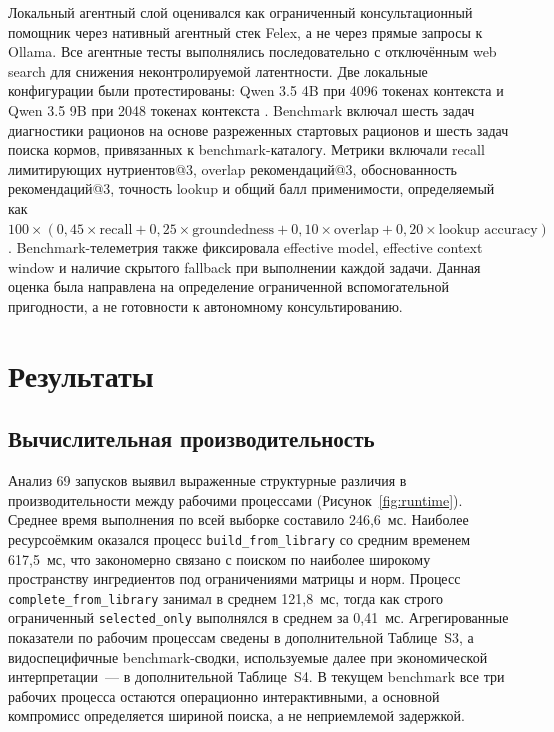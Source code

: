\documentclass[a4paper,fleqn]{cas-sc}
\begin{document}
Локальный агентный слой оценивался как ограниченный консультационный помощник через нативный агентный стек Felex, а не через прямые запросы к Ollama. Все агентные тесты выполнялись последовательно с отключённым web search для снижения неконтролируемой латентности. Две локальные конфигурации были протестированы: Qwen 3.5 4B при 4096 токенах контекста и Qwen 3.5 9B при 2048 токенах контекста \citep{qwen2023, ollama2023}. Benchmark включал шесть задач диагностики рационов на основе разреженных стартовых рационов и шесть задач поиска кормов, привязанных к benchmark-каталогу. Метрики включали recall лимитирующих нутриентов@3, overlap рекомендаций@3, обоснованность рекомендаций@3, точность lookup и общий балл применимости, определяемый как $100 \times (0{,}45 \times \text{recall} + 0{,}25 \times \text{groundedness} + 0{,}10 \times \text{overlap} + 0{,}20 \times \text{lookup accuracy})$. Benchmark-телеметрия также фиксировала effective model, effective context window и наличие скрытого fallback при выполнении каждой задачи. Данная оценка была направлена на определение ограниченной вспомогательной пригодности, а не готовности к автономному консультированию.

\section{Результаты}\label{sec:results}

\subsection{Вычислительная производительность}\label{subsec:performance}

Анализ 69 запусков выявил выраженные структурные различия в производительности между рабочими процессами (Рисунок~\ref{fig:runtime}). Среднее время выполнения по всей выборке составило 246{,}6~мс. Наиболее ресурсоёмким оказался процесс \texttt{build\_from\_library} со средним временем 617{,}5~мс, что закономерно связано с поиском по наиболее широкому пространству ингредиентов под ограничениями матрицы и норм. Процесс \texttt{complete\_from\_library} занимал в среднем 121{,}8~мс, тогда как строго ограниченный \texttt{selected\_only} выполнялся в среднем за 0{,}41~мс. Агрегированные показатели по рабочим процессам сведены в дополнительной Таблице~S3, а видоспецифичные benchmark-сводки, используемые далее при экономической интерпретации~--- в дополнительной Таблице~S4. В текущем benchmark все три рабочих процесса остаются операционно интерактивными, а основной компромисс определяется шириной поиска, а не неприемлемой задержкой.
\end{document}
